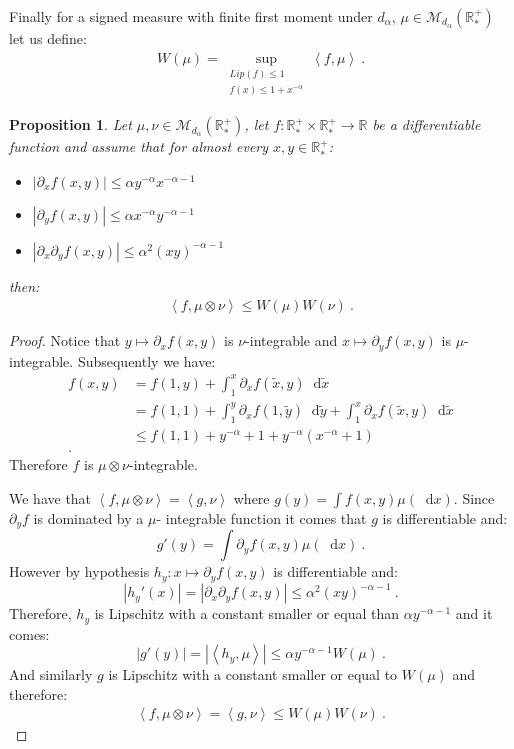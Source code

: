 \documentclass[11pt,a4paper]{article}
\newcommand{\RR}{\mathbb{R}}
\newcommand{\RRP}{\mathbb{R}^+_*}
\newcommand{\MC}{\mathcal{M}}
\newcommand{\brac}[1]{\left\langle#1\right\rangle}
\newcommand{\dd}{\mathop{}\!\mathrm{d}}
\newtheorem{proposition}[theorem]{Proposition}
\begin{document}
Finally for a signed measure with finite first moment under $d_\alpha$, $\mu \in \MC_{d_\alpha}(\RRP)$ let us define:
\begin{align*}
    W(\mu) = \sup\limits_{\substack{Lip(f) \leq 1\\ f(x) \leq 1 + x^{-\alpha}}} \brac{f,\mu}\ .
\end{align*}
\begin{proposition}\label{prop:characterization-product}
    Let $\mu,\nu \in \MC_{d_\alpha}(\RRP)$, let $f : \RRP\times \RRP \to \RR$ be a differentiable function and assume that for almost every $x,y \in \RRP$:
    \begin{itemize}
        \item $\left|\partial_x f(x,y)\right| \leq \alpha y^{-\alpha} x^{-\alpha - 1}$
        \item $\left|\partial_y f(x,y)\right| \leq \alpha x^{-\alpha} y^{-\alpha - 1}$
        \item $\left|\partial_x \partial_y f(x,y)\right| \leq \alpha^2 (xy)^{-\alpha - 1}$
    \end{itemize}
    then:
    \begin{align*}
        \brac{f,\mu\otimes \nu} \leq W(\mu)W(\nu)\ .
    \end{align*}
\end{proposition}
\begin{proof}
    Notice that $y \mapsto \partial_x f(x,y)$ is $\nu$-integrable and $x \mapsto \partial_y f(x,y)$ is $\mu$-integrable. Subsequently we have:
    \begin{align*}
        f(x,y) &= f(1,y) + \int_1^x \partial_x f(\tilde{x},y) \dd \tilde{x}\\
        &= f(1,1) + \int_1^y \partial_x f(1,\tilde{y}) \dd \tilde{y} + \int_1^x \partial_x f(\tilde{x},y) \dd \tilde{x}\\
        &\leq f(1,1) + y^{-\alpha} + 1 + y^{-\alpha}(x^{-\alpha} + 1)\\.
    \end{align*}
    Therefore $f$ is $\mu\otimes \nu$-integrable.

    We have that $\brac{f,\mu\otimes \nu} = \brac{g,\nu}$ where $g(y) = \int f(x,y) \mu(\dd x)$. Since $\partial_y f$ is dominated by a $\mu$- integrable function it comes that $g$ is differentiable and:
    \[ g'(y) = \int \partial_y f(x,y) \mu(\dd x)\ .\]
    However by hypothesis $h_y : x \mapsto \partial_y f(x,y)$ is differentiable and:
    \[
    |h_y'(x)| = \left|\partial_x \partial_y f(x,y)\right| \leq \alpha^2 (xy)^{-\alpha - 1}\ .
    \]
    Therefore, $h_y$ is Lipschitz with a constant smaller or equal than $\alpha y^{-\alpha - 1}$ and it comes:
    \[
    |g'(y)| = \left| \brac{h_y,\mu}\right| \leq \alpha y^{-\alpha - 1}W(\mu)\ .
    \]
    And similarly $g$ is Lipschitz with a constant smaller or equal to $W(\mu)$ and therefore:
    \begin{align*}
        \brac{f,\mu\otimes\nu} = \brac{g,\nu} \leq W(\mu)W(\nu)\ .
    \end{align*}
\end{proof}
\end{document}
